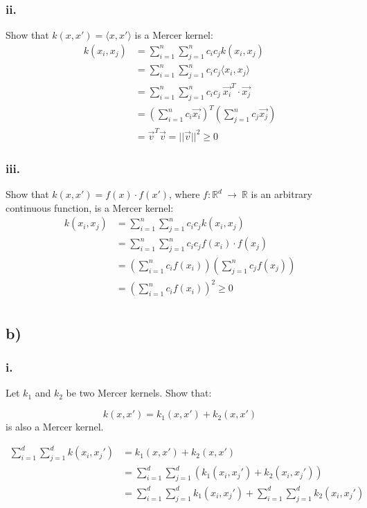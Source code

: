 \documentclass{article}
\begin{document}
\subsubsection*{ii.}
Show that
$k(x,x') = \langle x,x' \rangle$ is a Mercer kernel:\\
\begin{align}
k(x_i,x_j) &=\sum_{i=1}^n \sum_{j=1}^n c_i c_j k(x_i,x_j) \\
&= \sum_{i=1}^n \sum_{j=1}^n c_i c_j \langle x_i,x_j \rangle \\
&= \sum_{i=1}^n \sum_{j=1}^n c_i c_j \  \vec{x_i}^T \cdot \vec{x_j}  \\
&= (\sum_{i=1}^n c_i \vec{x_i})^T (\sum_{j=1}^n c_j \vec{x_j})  \\
&= \vec{v}^T \vec{v} = || \vec{v} ||^2 \geq 0
\end{align}

\subsubsection*{iii.}
Show that $
k(x,x') = f(x)\cdot f(x')$, where $f:\mathbb{R}^d~\rightarrow~\mathbb{R}$ is an arbitrary continuous function, is a Mercer kernel:\\
\begin{align}
k(x_i,x_j) &=\sum_{i=1}^n \sum_{j=1}^n c_i c_j k(x_i,x_j) \\
&= \sum_{i=1}^n \sum_{j=1}^n c_i c_j f(x_i) \cdot f(x_j) \\
&= (\sum_{i=1}^n c_i f(x_i))(\sum_{j=1}^n c_j f(x_j)) \\
&= (\sum_{i=1}^n c_i f(x_i))^2 \geq 0 \\
\end{align}


\subsection*{b)}

\subsubsection*{i.}
Let $k_1$ and $k_2$ be two Mercer kernels. Show that:

\begin{equation}
    k(x, x') = k_1(x, x') + k_2(x, x')
\end{equation}
is also a Mercer kernel.

\begin{align}
    \sum_{i=1}^d \sum_{j=1}^d k(x_i, x_j') &= k_1(x, x') + k_2(x, x') \\
    &= \sum_{i=1}^d \sum_{j=1}^d (k_1(x_i, x_j') + k_2(x_i, x_j'))\\
    &= \sum_{i=1}^d \sum_{j=1}^d k_1(x_i, x_j') + \sum_{i=1}^d \sum_{j=1}^d  k_2(x_i, x_j')
\end{align}
\end{document}
